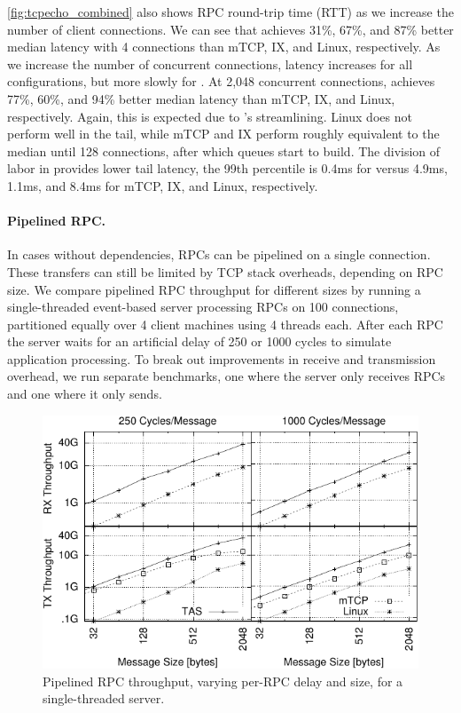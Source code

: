 \autoref{fig:tcpecho_combined} also shows RPC round-trip time (RTT) as
we increase the number of client connections. We can see that \softtcp
achieves 31\%, 67\%, and 87\% better median latency with 4 connections
than mTCP, IX, and Linux, respectively. As we increase the number of
concurrent connections, latency increases for all configurations, but
more slowly for \softtcp. At 2,048 concurrent connections, \taas
achieves 77\%, 60\%, and 94\% better median latency than mTCP, IX, and
Linux, respectively. Again, this is expected due to \rmttcp's
streamlining. Linux does not perform well in the tail, while mTCP and
IX perform roughly equivalent to the median until 128 connections,
after which queues start to build. The division of labor in \softtcp
provides lower tail latency, the 99th percentile is 0.4ms for \softtcp versus
4.9ms, 1.1ms, and 8.4ms for mTCP, IX, and Linux, respectively.

\paragraph{Pipelined RPC.} In cases without dependencies, RPCs can be
pipelined on a single connection. These transfers can still be limited
by TCP stack overheads, depending on RPC size. We compare pipelined
RPC throughput for different sizes by running a single-threaded
event-based server processing RPCs on 100 connections, partitioned
equally over 4 client machines using 4 threads each.  After each RPC
the server waits for an artificial delay of 250 or 1000 cycles to
simulate application processing. To break out improvements in receive
and transmission overhead, we run separate benchmarks, one where the
server only receives RPCs and one where it only sends.

\begin{figure}
  \centering
  \includegraphics[width=\columnwidth]{plots/unidir/unidir}
  \caption{Pipelined RPC throughput, varying per-RPC delay and
    size, for a single-threaded server.}
  \label{fig:microunidir}
\end{figure}

